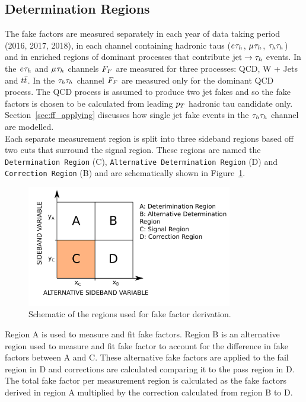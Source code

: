 \subsection{Determination Regions}
\label{sec:ff_dr}

The fake factors are measured separately in each year of data taking period (2016, 2017, 2018), in each channel containing hadronic taus ($e_{}\tau_{h}$, $\mu_{}\tau_{h}$, $\tau_{h}\tau_{h}$) and in enriched regions of dominant processes that contribute $\text{jet}\rightarrow\tau_{h}$ events.
In the $e_{}\tau_{h}$ and $\mu_{}\tau_{h}$ channels $F_{F}$ are measured for three processes: QCD, W + Jets and $t\bar{t}$.
In the $\tau_{h}\tau_{h}$ channel $F_{F}$ are measured only for the dominant QCD process.
The QCD process is assumed to produce two jet fakes and so the fake factors is chosen to be calculated from leading $p_{T}$ hadronic tau candidate only. 
Section~\ref{sec:ff_applying} discusses how single jet fake events in the $\tau_{h}\tau_{h}$ channel are modelled. \\

Each separate measurement region is split into three sideband regions based off two cuts that surround the signal region.
These regions are named the \texttt{Determination Region} (C), \texttt{Alternative Determination Region} (D) and \texttt{Correction Region} (B) and are schematically shown in Figure~\ref{fig:ff_schematic}. \\

\begin{figure}[!hbtp]
\centering
    \includegraphics[width=0.8\textwidth]{Figures/ff_diagram_v2.pdf}
\caption{Schematic of the regions used for fake factor derivation.}
\label{fig:ff_schematic}
\end{figure}

Region A is used to measure and fit fake factors.
Region B is an alternative region used to measure and fit fake factor to account for the difference in fake factors between A and C.
These alternative fake factors are applied to the fail region in D and corrections are calculated comparing it to the pass region in D.
The total fake factor per measurement region is calculated as the fake factors derived in region A multiplied by the correction calculated from region B to D. \\

